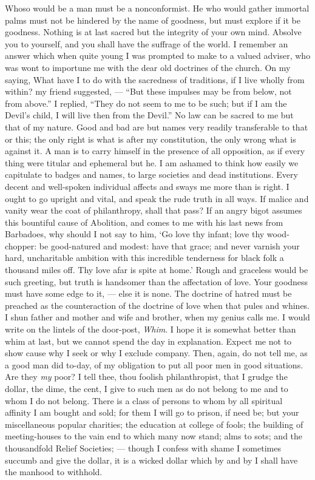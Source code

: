 \documentclass[12pt]{article}
\begin{document}
Whoso would be a man must be a nonconformist. He who would gather immortal
palms must not be hindered by the name of goodness, but must explore if it
be goodness. Nothing is at last sacred but the integrity of your own mind.
Absolve you to yourself, and you shall have the suffrage of the world. I
remember an answer which when quite young I was prompted to make to a valued
adviser, who was wont to importune me with the dear old doctrines of the
church. On my saying, What have I to do with the sacredness of traditions,
if I live wholly from within? my friend suggested, --- ``But these impulses
may be from below, not from above.'' I replied, ``They do not seem to me to be
such; but if I am the Devil's child, I will live then from the Devil.'' No
law can be sacred to me but that of my nature. Good and bad are but names
very readily transferable to that or this; the only right is what is after
my constitution, the only wrong what is against it. A man is to carry
himself in the presence of all opposition, as if every thing were titular
and ephemeral but he. I am ashamed to think how easily we capitulate to
badges and names, to large societies and dead institutions. Every decent and
well-spoken individual affects and sways me more than is right. I ought to
go upright and vital, and speak the rude truth in all ways. If malice and
vanity wear the coat of philanthropy, shall that pass? If an angry bigot
assumes this bountiful cause of Abolition, and comes to me with his last
news from Barbadoes, why should I not say to him, `Go love thy infant; love
thy wood-chopper: be good-natured and modest: have that grace; and never
varnish your hard, uncharitable ambition with this incredible tenderness for
black folk a thousand miles off. Thy love afar is spite at home.' Rough and
graceless would be such greeting, but truth is handsomer than the
affectation of love. Your goodness must have some edge to it, --- else it is
none. The doctrine of hatred must be preached as the counteraction of the
doctrine of love when that pules and whines. I shun father and mother and
wife and brother, when my genius calls me. I would write on the lintels of
the door-post, {\it Whim}. I hope it is somewhat better than whim at last, but
we cannot spend the day in explanation. Expect me not to show cause why I
seek or why I exclude company. Then, again, do not tell me, as a good man
did to-day, of my obligation to put all poor men in good situations. Are
they {\it my} poor? I tell thee, thou foolish philanthropist, that I grudge the
dollar, the dime, the cent, I give to such men as do not belong to me and to
whom I do not belong. There is a class of persons to whom by all spiritual
affinity I am bought and sold; for them I will go to prison, if need be; but
your miscellaneous popular charities; the education at college of fools; the
building of meeting-houses to the vain end to which many now stand; alms to
sots; and the thousandfold Relief Societies; --- though I confess with shame
I sometimes succumb and give the dollar, it is a wicked dollar which by and
by I shall have the manhood to withhold.
\end{document}
